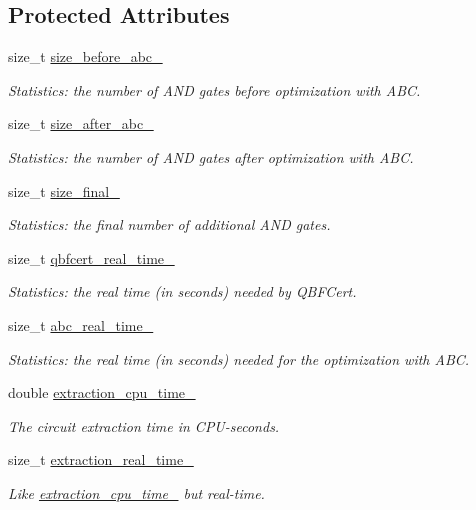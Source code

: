 \subsection*{Protected Attributes}
\begin{DoxyCompactItemize}
\item 
size\-\_\-t \hyperlink{classQBFCertImplExtractor_a51eb6677e876d90d1b3763ca3e5457e7}{size\-\_\-before\-\_\-abc\-\_\-}
\begin{DoxyCompactList}\small\item\em Statistics\-: the number of A\-N\-D gates before optimization with A\-B\-C. \end{DoxyCompactList}\item 
size\-\_\-t \hyperlink{classQBFCertImplExtractor_a18a1c9ab317cada48d54b7006124190e}{size\-\_\-after\-\_\-abc\-\_\-}
\begin{DoxyCompactList}\small\item\em Statistics\-: the number of A\-N\-D gates after optimization with A\-B\-C. \end{DoxyCompactList}\item 
size\-\_\-t \hyperlink{classQBFCertImplExtractor_ab22c545849fc2f85a49a846a836a5ec6}{size\-\_\-final\-\_\-}
\begin{DoxyCompactList}\small\item\em Statistics\-: the final number of additional A\-N\-D gates. \end{DoxyCompactList}\item 
size\-\_\-t \hyperlink{classQBFCertImplExtractor_ab596205af9db44f69af214adca44201c}{qbfcert\-\_\-real\-\_\-time\-\_\-}
\begin{DoxyCompactList}\small\item\em Statistics\-: the real time (in seconds) needed by Q\-B\-F\-Cert. \end{DoxyCompactList}\item 
size\-\_\-t \hyperlink{classQBFCertImplExtractor_a90be758f6fb963647db3aa9c384075d8}{abc\-\_\-real\-\_\-time\-\_\-}
\begin{DoxyCompactList}\small\item\em Statistics\-: the real time (in seconds) needed for the optimization with A\-B\-C. \end{DoxyCompactList}\item 
double \hyperlink{classCNFImplExtractor_ab8be06d42fd3c4b569ec22cfcf2f508e}{extraction\-\_\-cpu\-\_\-time\-\_\-}
\begin{DoxyCompactList}\small\item\em The circuit extraction time in C\-P\-U-\/seconds. \end{DoxyCompactList}\item 
size\-\_\-t \hyperlink{classCNFImplExtractor_ae06413cf08f868357d64545b3041aa18}{extraction\-\_\-real\-\_\-time\-\_\-}
\begin{DoxyCompactList}\small\item\em Like \hyperlink{classCNFImplExtractor_ab8be06d42fd3c4b569ec22cfcf2f508e}{extraction\-\_\-cpu\-\_\-time\-\_\-} but real-\/time. \end{DoxyCompactList}\end{DoxyCompactItemize}



